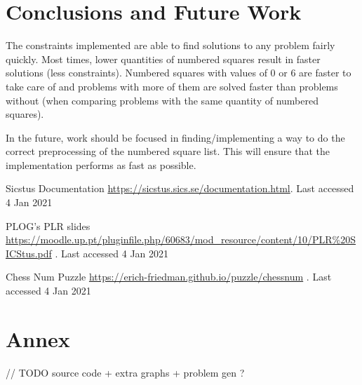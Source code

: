 \documentclass[runningheads]{llncs}
\begin{document}
\section{Conclusions and Future Work}
The constraints implemented are able to find solutions to any problem fairly
quickly. Most times, lower quantities of numbered squares result in faster
solutions (less constraints). Numbered squares with values of 0 or 6 are
faster to take care of and problems with more of them are solved faster than
problems without (when comparing problems with the same quantity of numbered squares).

In the future, work should be focused in finding/implementing a way to do the
correct preprocessing of the numbered square list. This will ensure that the
implementation performs as fast as possible.

\begin{thebibliography}{8}
    Sicstus Documentation
        \href{https://sicstus.sics.se/documentation.html}{https://sicstus.sics.se/documentation.html}.
        Last accessed 4 Jan 2021

    PLOG's PLR slides 
    \href{https://moodle.up.pt/pluginfile.php/60683/mod\_resource/content/10/PLR\%20SICStus.pdf}{https://moodle.up.pt/pluginfile.php/60683/mod\_resource/content/10/PLR\%20SICStus.pdf}
    . Last accessed 4 Jan 2021

    Chess Num Puzzle 
    \href{https://erich-friedman.github.io/puzzle/chessnum}{https://erich-friedman.github.io/puzzle/chessnum}
    . Last accessed 4 Jan 2021
\end{thebibliography}

\section{Annex}

// TODO source code + extra graphs + problem gen ?
\end{document}
